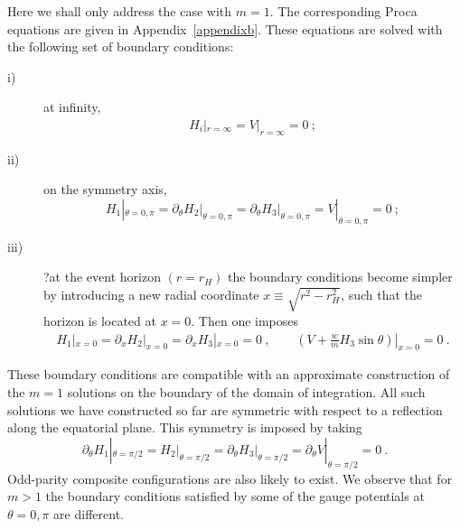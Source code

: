Here we shall only address the case with $m=1$. The corresponding Proca equations are given in Appendix~\ref{appendixb}.
These equations are solved with the following set of boundary conditions:
\begin{description}
%
\item[i)] at infinity, 
\begin{eqnarray}
  H_i|_{r=\infty}=V|_{r=\infty}=0\ ;
  \label{bccloudslarge}
\end{eqnarray}
\item[ii)] on the symmetry axis, 
%
\begin{equation}
H_1|_{\theta=0,\pi}
 = \partial_\theta H_2\big|_{\theta=0,\pi}=\partial_\theta H_3\big|_{\theta=0,\pi}=V|_{\theta=0,\pi}=0 \ ;
 \label{bccloudsaxis}
\end{equation}
\item[iii)]?at the event horizon $(r=r_H)$ the boundary conditions become simpler by introducing a new radial coordinate $x\equiv \sqrt{r^2-r_H^2}$, such that the horizon is located at $x=0$.
Then one imposes
\begin{eqnarray}
 H_1|_{x=0}=\partial_x H_2|_{x=0}=\partial_x H_3|_{x=0}= 0 \ , \qquad  \left(V+\frac{w}{m}H_3\sin\theta\right)|_{x=0}=0  
\label{bccloudshorizon} \ . 
\end{eqnarray}
\end{description}
%
These boundary conditions are compatible with an approximate construction of the $m=1$ solutions
on the boundary of the domain of integration. 
%
All such solutions we have constructed so far are symmetric with respect to a reflection along the equatorial plane. This symmetry is imposed by taking
 \begin{equation}
 \partial_\theta H_1|_{\theta=\pi/2}=
  H_2\big|_{\theta=\pi/2}=\partial_\theta H_3\big|_{\theta=\pi/2}= \partial_\theta  V|_{\theta=\pi/2}=0\ .
\end{equation}
Odd-parity composite configurations are also likely to exist.
%
We observe that for $m>1$ the boundary conditions satisfied 
by some of the gauge potentials
at $\theta=0,\pi$ are different.
 
